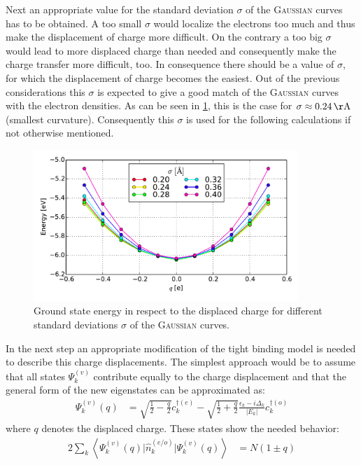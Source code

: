 Next an appropriate value for the standard deviation $\sigma$ of the \textsc{Gaussian} curves has to be obtained. A too small $\sigma$ would localize the electrons too much and thus make the displacement of charge more difficult. On the contrary a too big $\sigma$ would lead to more displaced charge than needed and consequently make the charge transfer more difficult, too. In consequence there should be a value of $\sigma$, for which the displacement of charge becomes the easiest. Out of the previous considerations this $\sigma$ is expected to give a good match of the \textsc{Gaussian} curves with the electron densities. As can be seen in \cref{image_gaussian_sigmas_hydrogen}, this is the case for $\sigma \approx \unit[0.24]{\AA}$ (smallest curvature). Consequently this $\sigma$ is used for the following calculations if not otherwise mentioned.\\
\begin{figure}
	\centering
	\includegraphics[width = 10cm]{Images/Hydrogen/charging/gaussian_sigmas}
	\caption{Ground state energy in respect to the displaced charge for different standard deviations $\sigma$ of the \textsc{Gaussian} curves.}
	\label{image_gaussian_sigmas_hydrogen}
\end{figure}
In the next step an appropriate modification of the tight binding model is needed to describe this charge displacements. The simplest approach would be to assume that all states $\Psi_k^{(v)}$ contribute equally to the charge displacement and that the general form of the new eigenstates can be approximated as:
\begin{align}
\Psi_k^{(v)}(q) &= \sqrt{\frac{1}{2}-\frac{q}{2}}c_k^{\dagger(e)}- \sqrt{\frac{1}{2}+\frac{q}{2}}\frac{\epsilon_k - i \Delta_k}{|E_k|}c_{k}^{\dagger(o)}
\end{align}
where $q$ denotes the displaced charge. These states show the needed behavior:
\begin{align}
	2\sum_k\left\langle\Psi_k^{(v)}(q)\Big|\hat{n}_k^{(e/o)}\Big|\Psi_k^{(v)}(q)\right\rangle &= N \left(1 \pm q\right)
\end{align}
